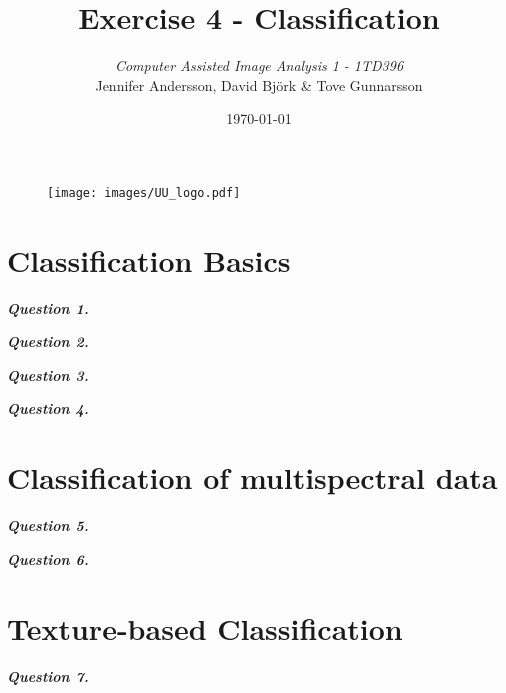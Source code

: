 \documentclass[12pt]{article}
\title{Exercise 4  - Classification}
\author{\textit{Computer Assisted Image Analysis 1  - 1TD396}  \vspace{1cm} \\
         Jennifer Andersson, David Björk \& Tove Gunnarsson \vspace{0.7cm}\\
        }
\date{\today}
\begin{document}
\maketitle

\begin{figure}[b]
  \centering
  \texttt{[image: images/UU\_logo.pdf]}
\end{figure}
\thispagestyle{empty}

\clearpage

\newpage
\section{Classification Basics}


\textbf{\emph{Question 1.}}



\textbf{\emph{Question 2.}}


\textbf{\emph{Question 3.}}


\textbf{\emph{Question 4.}}


\section{Classification of multispectral data}
\textbf{\emph{Question 5.}}

\textbf{\emph{Question 6.}}

\section{Texture-based Classification}
\textbf{\emph{Question 7.}}
\end{document}
